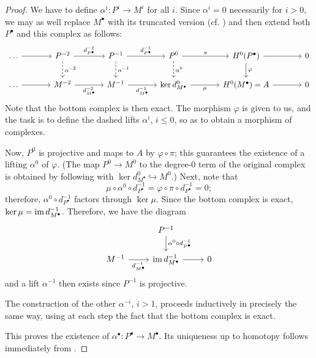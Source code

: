 \begin{proof}
  We have to define $\alpha^i : P^i \to M^i$ for all $i$. Since
  $\alpha^i = 0$ necessarily for $i > 0$, we may as well replace
  $M^\bullet$ with its truncated version
  (cf. )
  and then extend both $P^\bullet$ and this complex as follows:
  \[\begin{tikzcd}[column sep=large]
      \dots \arrow[r] & P^{-2} \arrow[r, "d_{P^\bullet}^{-2}"]
      \arrow[d, dashed, "\alpha^{-2}"] & P^{-1} \arrow[r,
      "d_{P^\bullet}^{-1}"] \arrow[d, dashed, "\alpha^{-1}"] & P^0
      \arrow[r, "\pi"] \arrow[d, dashed, "\alpha^0"] &
      H^0(P^\bullet) \arrow[r] \arrow[d, "\varphi"] & 0 \\
      \dots \arrow[r] & M^{-2} \arrow[r, "d_{M^\bullet}^{-2}"'] &
      M^{-1} \arrow[r, "d_{M^\bullet}^{-1}"'] & \ker d^0_{M^\bullet}
      \arrow[r, "\mu"'] & H^0(M^\bullet) = A \arrow[r] & 0
    \end{tikzcd}\] Note that the bottom complex is then exact. The
  morphism $\varphi$ is given to us, and the task is to define the
  dashed lifts $\alpha^i$, $i \le 0$, so as to obtain a morphism of
  complexes.

  Now, $P^0$ is projective and maps to $A$ by $\varphi \circ \pi$;
  this guarantees the existence of a lifting $\alpha^0$ of $\varphi$.
  (The map $P^0 \to M^0$ to the degree-$0$ term of the original
  complex is obtained by following with
  $\ker d^0_{M^\bullet} \hookrightarrow M^0$.) Next, note that
  \[
    \mu \circ \alpha^0 \circ d^{-1}_{P^\bullet} = \varphi \circ \pi
    \circ d^{-1}_{P^\bullet} = 0;
  \]
  therefore, $\alpha^0 \circ d^{-1}_{P^\bullet}$ factors through
  $\ker\mu$. Since the bottom complex is exact,
  $\ker\mu = \operatorname{im} d^{-1}_{M^\bullet}$. Therefore, we have the
  diagram
  \[\begin{tikzcd}
      & P^{-1} \arrow[d, "\alpha^0 \circ d_{P^\bullet}^{-1}"] \\
      M^{-1} \arrow[r, "d_{M^\bullet}^{-1}"'] & \image
      d_{M^\bullet}^{-1} \arrow[r] & 0
    \end{tikzcd}\] and a lift $\alpha^{-1}$ then exists since $P^{-1}$
  is projective.

  The construction of the other $\alpha^{-i}$, $i > 1$, proceeds
  inductively in precisely the same way, using at each step the fact
  that the bottom complex is exact.

  This proves the existence of
  $\alpha^\bullet : P^\bullet \to M^\bullet$. Its uniqueness up to
  homotopy follows immediately from .
\end{proof}

